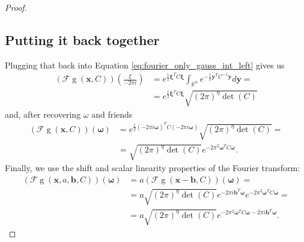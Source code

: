 \documentclass{paper}
\newcommand{\F}{\ensuremath{\mathcal{F}}}
\newcommand{\vr}[1]{\ensuremath{\boldsymbol{#1}}}
\newcommand{\f}[1]{\operatorname{#1}}
\newcommand{\omegavec}[0]{\ensuremath{\vr{\omega{}}}}
\newcommand{\xivec}[0]{\ensuremath{\vr{\xi{}}}}
\newcommand{\bvec}[0]{\ensuremath{\vr{b}}}
\newcommand{\yvec}[0]{\ensuremath{\vr{y}}}
\begin{document}
\begin{proof}
\subsection*{Putting it back together}
Plugging that back into Equation \ref{eq:fourier_only_gauss_int_left} gives us
\begin{align*}
	(\F\f{g}(\vr{x}, C))(\frac{\xi}{-2 \pi i})
	&= e^{\frac{1}{2} \xivec^T C \xivec} \int_{\mathbb{R}^n} e^{-\frac{1}{2} \yvec^T C^{-1} \yvec}  d\yvec = \\
	&= e^{\frac{1}{2} \xivec^T C \xivec} \sqrt{(2 \pi)^\eta \f{det}(C)}
\end{align*}
and, after recovering $\omega$ and friends
\begin{align*}
(\F\f{g}(\vr{x}, C))(\omegavec)
&= e^{\frac{1}{2} (-2 \pi i \omegavec)^T C (-2 \pi i \omegavec)} \sqrt{(2 \pi)^\eta \f{det}(C)} = \\
&= \sqrt{(2 \pi)^\eta \f{det}(C)} e^{-2 \pi^2 \omegavec^T C \omegavec}.
\end{align*}
Finally, we use the shift and scalar linearity properties of the Fourier transform:
\begin{align}
(\F\f{g}(\vr{x}, a, \bvec, C))(\omegavec) &= a (\F\f{g}(\vr{x} - \bvec, C))(\omegavec) = \nonumber \\
&= a \sqrt{(2 \pi)^\eta \f{det}(C)} e^{-2\pi i \bvec^T \omegavec} e^{-2 \pi^2 \omegavec^T C \omegavec} =\nonumber \\
&= a \sqrt{(2 \pi)^\eta \f{det}(C)} e^{-2 \pi^2 \omegavec^T C \omegavec - 2\pi i \bvec^T \omegavec}.
\end{align}

\end{proof}

\clearpage
\end{document}
